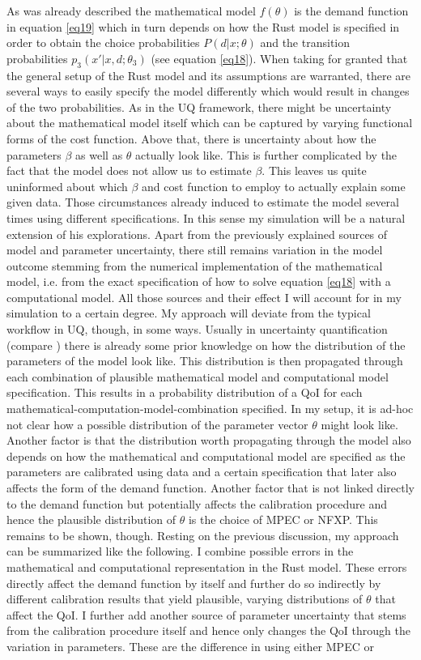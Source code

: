 As was already described the mathematical model $f(\theta)$ is the demand function in equation \ref{eq19} which in turn depends on how the Rust model is specified in order to obtain the choice probabilities $P(d|x; \theta)$ and the transition probabilities $p_3(x'|x, d; \theta_3)$ (see equation \ref{eq18}). When taking for granted that the general setup of the Rust model and its assumptions are warranted, there are several ways to easily specify the model differently which would result in changes of the two probabilities. As in the UQ framework, there might be uncertainty about the mathematical model itself which can be captured by varying functional forms of the cost function. Above that, there is uncertainty about how the parameters $\beta$ as well as $\theta$ actually look like. This is further complicated by the fact that the model does not allow us to estimate $\beta$. This leaves us quite uninformed about which $\beta$ and cost function to employ to actually explain some given data. Those circumstances already induced \cite{Rust.1987} to estimate the model several times using different specifications. In this sense my simulation will be a natural extension of his explorations. Apart from the previously explained sources of model and parameter uncertainty, there still remains variation in the model outcome stemming from the numerical implementation of the mathematical model, i.e. from the exact specification of how to solve equation \ref{eq18} with a computational model. All those sources and their effect I will account for in my simulation to a certain degree. My approach will deviate from the typical workflow in UQ, though, in some ways. Usually in uncertainty quantification (compare \cite{Smith.2013, Oberkampf.2010}) there is already some prior knowledge on how the distribution of the parameters of the model look like. This distribution is then propagated through each combination of plausible mathematical model and computational model specification. This results in a probability distribution of a QoI for each mathematical-computation-model-combination specified. In my setup, it is ad-hoc not clear how a possible distribution of the parameter vector $\theta$ might look like. Another factor is that the distribution worth propagating through the model also depends on how the mathematical and computational model are specified as the parameters are calibrated using data and a certain specification that later also affects the form of the demand function. Another factor that is not linked directly to the demand function but potentially affects the calibration procedure and hence the plausible distribution of $\theta$ is the choice of MPEC or NFXP. This remains to be shown, though. Resting on the previous discussion, my approach can be summarized like the following. I combine possible errors in the mathematical and computational representation in the Rust model. These errors directly affect the demand function by itself and further do so indirectly by different calibration results that yield plausible, varying distributions of $\theta$ that affect the QoI. I further add another source of parameter uncertainty that stems from the calibration procedure itself and hence only changes the QoI through the variation in parameters. These are the difference in using either MPEC or 